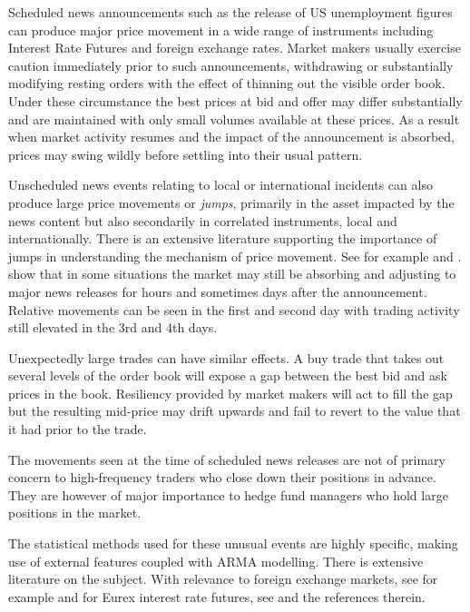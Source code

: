 Scheduled news announcements such as the release of US unemployment figures can produce major price movement in a wide range of instruments including Interest Rate Futures and foreign exchange rates.  Market makers usually exercise caution immediately prior to such announcements, withdrawing or substantially modifying  resting orders with the effect of thinning out the visible order book. Under these circumstance the best prices at bid and offer may differ  substantially and are maintained with only small volumes available at these prices.  As a result when market activity resumes and the impact of the announcement is absorbed, prices may swing wildly before settling into their usual pattern.
 
Unscheduled news events relating to local or international incidents can also produce large price movements or \emph{jumps}, primarily in the asset impacted by the news content but also secondarily in correlated instruments, local and internationally. There is an extensive literature supporting the importance of jumps in understanding the mechanism of price movement. See for example \citet{bollerslev2008risk} and \citet{corsi2010threshold}. \citet{evans2005currency} show that in some situations the market may still be absorbing and adjusting to major news releases for hours and sometimes days after the announcement. Relative movements can be seen in the first and second day with trading activity still elevated in the 3rd and 4th days.  
 
 Unexpectedly large trades can have similar effects. A buy trade that takes out several levels of the order book will expose a gap between the best bid and ask prices in the book. Resiliency provided by market makers will act to fill the gap but the resulting mid-price may drift upwards and fail to revert to the value that it had prior to the trade.  
 
The movements seen at the time of scheduled news releases are not of primary concern to high-frequency traders who close down their positions in advance.  They are however of major importance to hedge fund managers who hold large positions in the market. 

The statistical methods used for these unusual events are highly specific, making use of external features coupled with ARMA modelling. There is extensive literature on the subject. With relevance to foreign exchange markets, see for example \citet{love2005microstructural} and for  Eurex interest rate futures, see \citet{almgren2012high} and the references therein.
